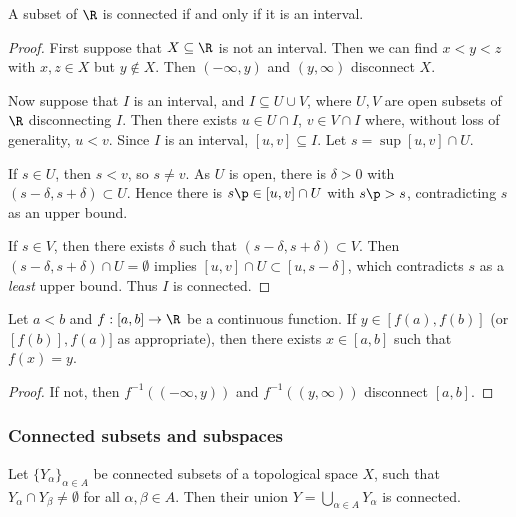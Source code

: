 \begin{theorem}
	A subset of $\R$ is connected if and only if it is an interval. \label{thm:cnncted-R-interval}
\end{theorem}

\begin{proof}
	First suppose that $X\subseteq\R$ is not an interval. Then we can find $x<y<z$ with $x,z\in X$ but $y\not\in X$. Then $(-\infty,y)$ and $(y,\infty)$ disconnect $X$.

	Now suppose that $I$ is an interval, and $I\subseteq U \cup V$, where $U,V$ are open subsets of $\R$ disconnecting $I$. Then there exists $u\in U\cap I$, $v\in V\cap I$ where, without loss of generality, $u<v$. Since $I$ is an interval, $[u,v] \subseteq I$. Let $s=\sup[u,v] \cap U$.

	If $s\in U$, then $s<v$, so $s\neq v$. As $U$ is open, there is $\delta>0$ with $(s-\delta,s+\delta) \subset U$. Hence there is $s\p \in [u,v]\cap U$ with $s\p>s$, contradicting $s$ as an upper bound.

	If $s\in V$, then there exists $\delta$ such that $(s-\delta,s+\delta) \subset V$. Then $(s-\delta,s+\delta) \cap U = \emptyset$ implies $[u,v] \cap U \subset [u,s-\delta]$, which contradicts $s$ as a \emph{least} upper bound. Thus $I$ is connected.
\end{proof}

\begin{corollary}
	 Let $a<b$ and $f:[a,b]\to\R$ be a continuous function. If $y\in[f(a),f(b)]$ (or $[f(b)],f(a)]$ as appropriate), then there exists $x\in [a,b]$ such that $f(x)=y$.
\end{corollary}

\begin{proof}
	If not, then $f^{-1}((-\infty,y))$ and $f^{-1}((y,\infty))$ disconnect $[a,b]$.
\end{proof}


\subsubsection*{Connected subsets and subspaces} %
\label{ssub:connected_subsets_and_subspaces}

\begin{proposition}
	Let $\{Y_\alpha\}_{\alpha\in A}$ be connected subsets of a topological space $X$, such that $Y_\alpha \cap Y_\beta \neq \emptyset$ for all $\alpha,\beta \in A$. Then their union $Y=\bigcup_{\alpha\in A} Y_\alpha$ is connected. \label{prop:connected-unions}
\end{proposition}

